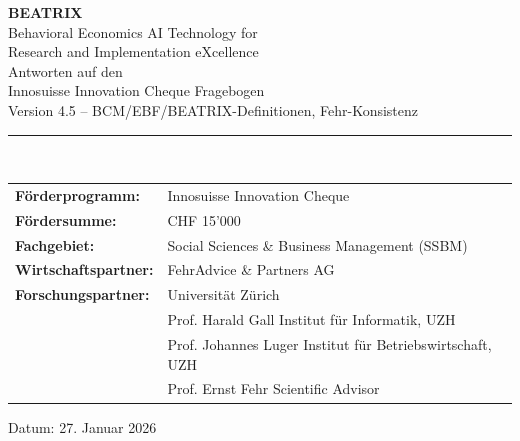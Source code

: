 \documentclass[11pt,a4paper]{article}
\begin{document}

\begin{titlepage}
\centering
\vspace*{2cm}

{\Huge\bfseries\color{fehrblue} BEATRIX}\\[0.5cm]
{\Large Behavioral Economics AI Technology for\\Research and Implementation eXcellence}\\[2cm]

{\LARGE Antworten auf den\\Innosuisse Innovation Cheque Fragebogen}\\[1cm]

{\large Version 4.5 -- BCM/EBF/BEATRIX-Definitionen, Fehr-Konsistenz}\\[2cm]

\rule{0.8\textwidth}{0.5pt}\\[1.5cm]

\begin{tabular}{ll}
\textbf{Förderprogramm:} & Innosuisse Innovation Cheque \\[0.3cm]
\textbf{Fördersumme:} & CHF 15'000 \\[0.3cm]
\textbf{Fachgebiet:} & Social Sciences \& Business Management (SSBM) \\[0.3cm]
\textbf{Wirtschaftspartner:} & FehrAdvice \& Partners AG \\[0.3cm]
\textbf{Forschungspartner:} & Universität Zürich \\[0.3cm]
& Prof. Harald Gall \quad Institut für Informatik, UZH \\
& Prof. Johannes Luger \quad Institut für Betriebswirtschaft, UZH \\
& Prof. Ernst Fehr \quad Scientific Advisor \\
\end{tabular}

\vfill


\vfill

{\large Datum: 27. Januar 2026}

\end{titlepage}
\end{document}
